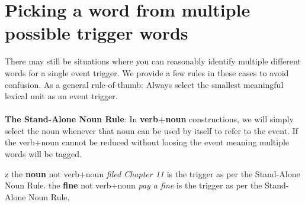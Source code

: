 \documentclass[a4paper]{report}
\begin{document}



\section{Picking a word from multiple possible trigger words}

There may still be situations where you can reasonably identify multiple different words for a single event trigger. We provide a few rules in these cases to avoid confusion. As a general rule-of-thumb: Always select the smallest meaningful lexical unit as an event trigger.
\\\\
\noindent\textbf{The Stand-Alone Noun Rule}:
In \textbf{verb+noun} constructions, we will simply select the noun whenever that noun can be used by itself to refer to the event.
If the verb+noun cannot be reduced without loosing the event meaning multiple words will be tagged.

\begin{exe}z
    \ex {}
        \expl the \textbf{noun}  not verb+noun \textit{filed Chapter 11} is the trigger as per the Stand-Alone Noun Rule.
    \ex {}
        \expl the \textbf{fine}  not verb+noun \textit{pay a fine} is the trigger as per the Stand-Alone Noun Rule.
\end{exe}
\end{document}
